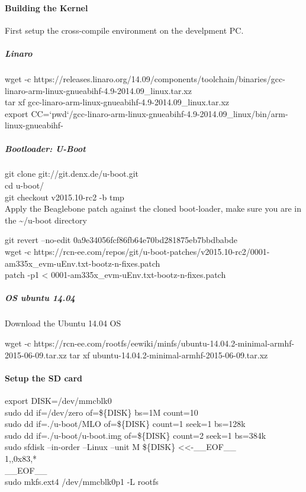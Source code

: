 \paragraph{Building the Kernel}
First setup the cross-compile environment on the develpment PC.

\subparagraph{Linaro}
\begin{sBox}
	wget -c https://releases.linaro.org/14.09/components/toolchain/binaries/gcc-linaro-arm-linux-gnueabihf-4.9-2014.09\_linux.tar.xz\\
	tar xf gcc-linaro-arm-linux-gnueabihf-4.9-2014.09\_linux.tar.xz\\
	export CC=`pwd`/gcc-linaro-arm-linux-gnueabihf-4.9-2014.09\_linux/bin/arm-linux-gnueabihf-\\
\end{sBox}

\subparagraph{Bootloader: U-Boot}
\begin{sBox}
	git clone git://git.denx.de/u-boot.git\\
	cd u-boot/\\
	git checkout v2015.10-rc2 -b tmp\\

	Apply the Beaglebone patch against the cloned boot-loader, make sure you are in the \~{}/u-boot directory  
	
	git revert --no-edit 0a9e34056fcf86fb64e70bd281875eb7bbdbabde\\
	wget -c https://rcn-ee.com/repos/git/u-boot-patches/v2015.10-rc2/0001-am335x\_evm-uEnv.txt-bootz-n-fixes.patch\\
	patch -p1 < 0001-am335x\_evm-uEnv.txt-bootz-n-fixes.patch\\
\end{sBox}

\subparagraph{OS ubuntu 14.04}
Download the Ubuntu 14.04 OS  
\begin{sBox}
	wget -c https://rcn-ee.com/rootfs/eewiki/minfs/ubuntu-14.04.2-minimal-armhf-2015-06-09.tar.xz  
	tar xf ubuntu-14.04.2-minimal-armhf-2015-06-09.tar.xz\\
\end{sBox}

\paragraph{Setup the SD card}
\begin{sBox}
	export DISK=/dev/mmcblk0\\
	sudo dd if=/dev/zero of=\$\{DISK\} bs=1M count=10\\
	sudo dd if=./u-boot/MLO of=\$\{DISK\} count=1 seek=1 bs=128k\\
	sudo dd if=./u-boot/u-boot.img of=\$\{DISK\} count=2 seek=1 bs=384k\\
	sudo sfdisk --in-order --Linux --unit M \$\{DISK\} <<-\_\_EOF\_\_\\
	1,,0x83,*\\
	\_\_EOF\_\_\\
	sudo mkfs.ext4 /dev/mmcblk0p1 -L rootfs\\
\end{sBox}

